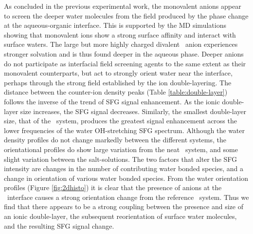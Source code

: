 As concluded in the previous experimental work, the monovalent anions appear to screen the deeper water molecules from the field produced by the phase change at the aqueous-organic interface. This is supported by the MD simulations showing that monovalent ions show a strong surface affinity and interact with surface waters. The large but more highly charged divalent \sul~anion experiences stronger solvation and is thus found deeper in the aqueous phase. Deeper anions do not participate as interfacial field screening agents to the same extent as their monovalent counterparts, but act to strongly orient water near the interface, perhaps through the strong field established by the ion double-layering. The distance between the counter-ion density peaks (Table \ref{table:double-layer}) follows the inverse of the trend of SFG signal enhancement. As the ionic double-layer size increases, the SFG signal decreases. Similarly, the smallest double-layer size, that of the \sul~system, produces the greatest signal enhancement across the lower frequencies of the water OH-stretching SFG spectrum. Although the water density profiles do not change markedly between the different systems, the orientational profiles do show large variation from the neat \ctcwat~system, and some slight variation between the salt-solutions. The two factors that alter the SFG intensity are changes in the number of contributing water bonded species, and a change in orientation of various water bonded species. From the water orientation profiles (Figure \ref{fig:2dhisto}) it is clear that the presence of anions at the \ctcwat~interface causes a strong orientation change from the reference \ctcwat~system. Thus we find that there appears to be a strong coupling between the presence and size of an ionic double-layer, the subsequent reorientation of surface water molecules, and the resulting SFG signal change.
